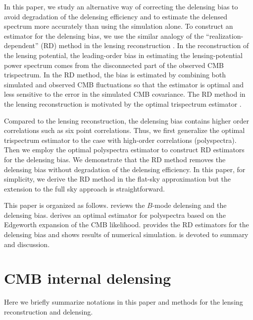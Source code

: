\documentclass[aps,prd,twocolumn,superscriptaddress,groupedaddress,nofootinbib]{revtex4}
\begin{document}
In this paper, we study an alternative way of correcting the delensing bias 
to avoid degradation of the delensing efficiency and to estimate the delensed spectrum more accurately 
than using the simulation alone. To construct an estimator for the delensing bias, 
we use the similar analogy of the ``realization-dependent'' (RD) method in the lensing reconstruction 
\cite{Namikawa:2012,P13:phi,P15:phi}. 
In the reconstruction of the lensing potential, the leading-order bias in estimating 
the lensing-potential power spectrum comes from the disconnected part of the observed CMB trispectrum. 
In the RD method, the bias is estimated by combining both simulated and observed CMB fluctuations 
so that the estimator is optimal and less sensitive to the error in the simulated CMB covariance. 
The RD method in the lensing reconstruction is motivated by the optimal trispectrum estimator \cite{Regan:2010cn}. 

Compared to the lensing reconstruction, the delensing bias contains higher order correlations 
such as six point correlations. 
Thus, we first generalize the optimal trispectrum estimator to the case with high-order correlations (polyspectra). 
Then we employ the optimal polyspectra estimator to construct RD estimators for the delensing bias. 
We demonstrate that the RD method removes the delensing bias without degradation of the delensing efficiency. 
In this paper, for simplicity, we derive the RD method in the flat-sky approximation 
but the extension to the full sky approach is straightforward. 

This paper is organized as follows. 
 reviews the $B$-mode delensing and the delensing bias. 
 derives an optimal estimator for polyspectra based on the Edgeworth expansion of the CMB likelihood. 
 provides the RD estimators for the delensing bias and shows results of numerical simulation. 
 is devoted to summary and discussion. 

\section{CMB internal delensing} \label{bias}

Here we briefly summarize notations in this paper and methods for the lensing reconstruction and delensing. 
\end{document}
